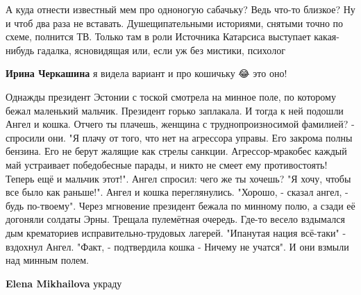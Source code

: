 \begin{itemize}
А куда отнести известный мем про одноногую сабачьку? Ведь что-то близкое? \Smiley[1.0][yellow]
Ну и чтоб два раза не вставать. Душещипательными историями, снятыми точно по схеме, полнится ТВ. Только там в роли Источника Катарсиса выступает какая-нибудь гадалка, ясновидящая или, если уж без мистики, психолог \Smiley[1.0][yellow]

\begin{itemize}
 
\textbf{Ирина Черкашина} я видела вариант и про кошичьку 😂 это оно!
\end{itemize}

 

Однажды президент Эстонии с тоской смотрела на минное поле, по которому бежал
маленький мальчик. Президент горько заплакала. И тогда к ней подошли Ангел и
кошка. Отчего ты плачешь, женщина с труднопроизносимой фамилией? - спросили
они. "Я плачу от того, что нет на агрессора управы. Его закрома полны бензина.
Его не берут жалящие как стрелы санкции. Агрессор-мракобес каждый май
устраивает победобесные парады, и никто не смеет ему противостоять! Теперь ещё
и мальчик этот!". Ангел спросил: чего же ты хочешь? "Я хочу, чтобы все было как
раньше!". Ангел и кошка переглянулись. "Хорошо, - сказал ангел, - будь
по-твоему". Через мгновение президент бежала по минному полю, а сзади её
догоняли солдаты Эрны. Трещала пулемётная очередь. Где-то весело вздымался дым
крематориев исправительно-трудовых лагерей. "Ипанутая нация всё-таки" -
вздохнул Ангел. "Факт, - подтвердила кошка - Ничему не учатся". И они взмыли
над минным полем.

\begin{itemize}
 
\textbf{Elena Mikhailova} украду


\end{itemize}
\end{itemize}
